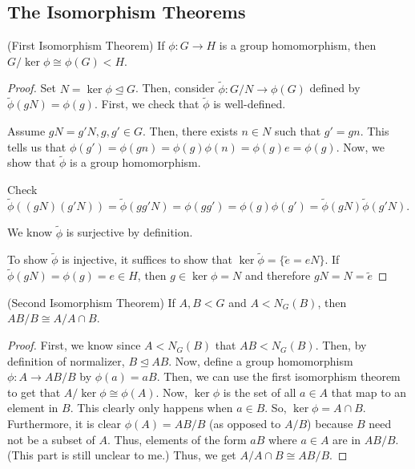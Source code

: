 \documentclass[11pt,leqno,oneside]{amsart}
\newcommand{\subgroup}{\mathrel{<}}
\newcommand{\normsubgroup}{\mathrel{\unlhd}}
\newcommand{\isom}{\mathrel{\cong}}
\begin{document}
\subsection*{The Isomorphism Theorems}
\begin{thm}
    (First Isomorphism Theorem) If $\phi: G \to H$ is a group homomorphism, then $G/\ker \phi \isom \phi(G) \subgroup H$.
\end{thm}
\begin{proof}
    Set $N = \ker \phi \normsubgroup G$. Then, consider $\widetilde{\phi}: G/N
    \to \phi(G)$ defined by $\widetilde{\phi}(gN) = \phi(g)$. First, we check
    that $\widetilde{\phi}$ is well-defined.

    Assume $gN = g'N, g,g' \in G$. Then, there exists $n \in N$ such that $g'
    = gn$. This tells us that $\phi(g') = \phi(gn) = \phi(g)\phi(n) = \phi(g)e
    = \phi(g)$. Now, we show that $\widetilde{\phi}$ is a group homomorphism.

    Check $\widetilde{\phi}( (gN)(g'N) ) = \widetilde{\phi}(gg'N) = \phi(gg') =
    \phi(g)\phi(g') = \widetilde{\phi}(gN) \widetilde{\phi}(g'N)$.

    We know $\widetilde{\phi}$ is surjective by definition.

    To show $\widetilde{\phi}$ is injective, it suffices to show that $\ker
    \widetilde{\phi} = \{\widetilde{e} = eN\}$. If $\widetilde{\phi}(gN) =
    \phi(g) = e \in H$, then $g \in \ker \phi = N$ and therefore $gN = N =
    \widetilde{e}$
\end{proof}
\begin{cor}
    (Second Isomorphism Theorem) If $A,B \subgroup G$ and $A \subgroup N_G(B)$,
    then $AB/B \isom A/A\cap B$.
\end{cor}
\begin{proof}
    First, we know since $A \subgroup N_G(B)$ that $AB \subgroup N_G(B)$. Then,
    by definition of normalizer, $B \normsubgroup AB$. Now, define a group
    homomorphism $\phi: A \to AB/B$ by $\phi(a) = aB$. Then, we can use the
    first isomorphism theorem to get that $A/\ker \phi \isom \phi(A)$. Now,
    $\ker \phi$ is the set of all $a \in A$ that map to an element in $B$. This
    clearly only happens when $a \in B$. So, $\ker \phi = A \cap B$.
    Furthermore, it is clear $\phi(A) = AB/B$ (as opposed to $A/B$) because $B$
    need not be a subset of $A$. Thus, elements of the form $aB$ where $a \in A$
    are in $AB/B$. (This part is still unclear to me.) Thus, we get $A/A \cap B
    \isom AB/B$.
\end{proof}
\end{document}

